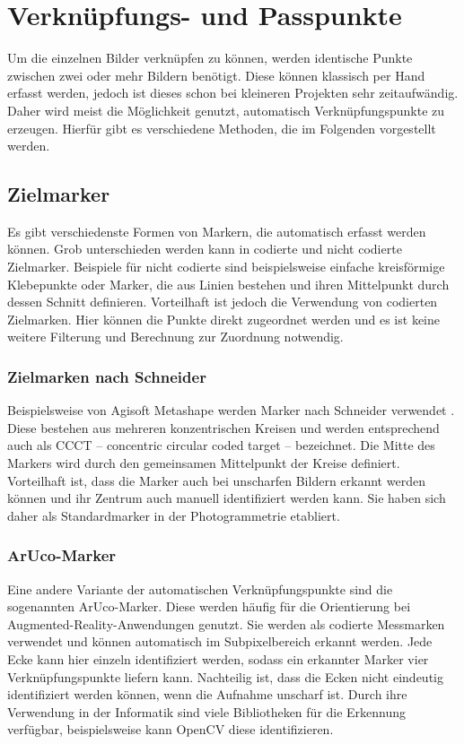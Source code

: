 \documentclass[./00PhotoBox.tex]{subfiles}
\begin{document}
\section{Verknüpfungs- und Passpunkte}
\label{s:verknuepfung}
Um die einzelnen Bilder verknüpfen zu können, werden identische Punkte zwischen zwei oder mehr Bildern benötigt. Diese können klassisch per Hand erfasst werden, jedoch ist dieses schon bei kleineren Projekten sehr zeitaufwändig. Daher wird meist die Möglichkeit genutzt, automatisch Verknüpfungspunkte zu erzeugen. Hierfür gibt es verschiedene Methoden, die im Folgenden vorgestellt werden.


\subsection{Zielmarker}
Es gibt verschiedenste Formen von Markern, die automatisch erfasst werden können. Grob unterschieden werden kann in codierte und nicht codierte Zielmarker. Beispiele für nicht codierte sind beispielsweise einfache kreisförmige Klebepunkte oder Marker, die aus Linien bestehen und ihren Mittelpunkt durch dessen Schnitt definieren.
Vorteilhaft ist jedoch die Verwendung von codierten Zielmarken. Hier können die Punkte direkt zugeordnet werden und es ist keine weitere Filterung und Berechnung zur Zuordnung notwendig. \citep[S.535ff]{luhmann}

\subsubsection{Zielmarken nach Schneider}
Beispielsweise von Agisoft Metashape werden Marker nach Schneider verwendet \citep{ccct}. Diese bestehen aus mehreren konzentrischen Kreisen und werden entsprechend auch als CCCT -- concentric circular coded target -- bezeichnet. Die Mitte des Markers wird durch den gemeinsamen Mittelpunkt der Kreise definiert.  Vorteilhaft ist, dass die Marker auch bei unscharfen Bildern erkannt werden können und ihr Zentrum auch manuell identifiziert werden kann. Sie haben sich daher als Standardmarker in der Photogrammetrie etabliert.


\subsubsection{ArUco-Marker}
Eine andere Variante der automatischen Verknüpfungspunkte sind die sogenannten ArUco-Marker. Diese werden häufig für die Orientierung bei Augmented-Reality-An\-wend\-ungen genutzt. Sie werden als codierte Messmarken verwendet und können automatisch im Subpixelbereich erkannt werden. Jede Ecke kann hier einzeln identifiziert werden, sodass ein erkannter Marker vier Verknüpfungspunkte liefern kann. Nachteilig ist, dass die Ecken nicht eindeutig identifiziert werden können, wenn die Aufnahme unscharf ist. Durch ihre Verwendung in der Informatik sind viele Bibliotheken für die Erkennung verfügbar, beispielsweise kann OpenCV diese identifizieren. %
\end{document}
